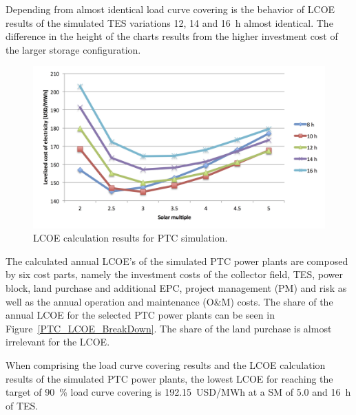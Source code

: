 Depending from almost identical load curve covering is the behavior of LCOE results of the simulated TES variations 12, 14 and \SI{16}{h} almost identical. The difference in the height of the charts results from the higher investment cost of the larger storage configuration.

\begin{figure}[htbp]  
\centering
\includegraphics[width=1\linewidth]{FIG/PTC_LCOE}
\caption[LCOE calculation results for PTC simulation.]{LCOE calculation results for PTC simulation.}\label{PTC_LCOE}
\end{figure}
The calculated annual LCOE's of the simulated PTC power plants are composed by six cost parts, namely the investment costs of the collector field, TES, power block, land purchase and additional EPC, project management (PM) and risk as well as the annual operation and maintenance (O\&M) costs. The share of the annual LCOE for the selected PTC power plants can be seen in Figure~\ref{PTC_LCOE_BreakDown}. The share of the land purchase is almost irrelevant for the LCOE. 

When comprising the load curve covering results and the LCOE calculation results of the simulated PTC power plants, the lowest LCOE for reaching the target of 90~\% load curve covering is \SI{192.15}{USD/MWh} at a SM of 5.0 and \SI{16}{h} of TES. 

